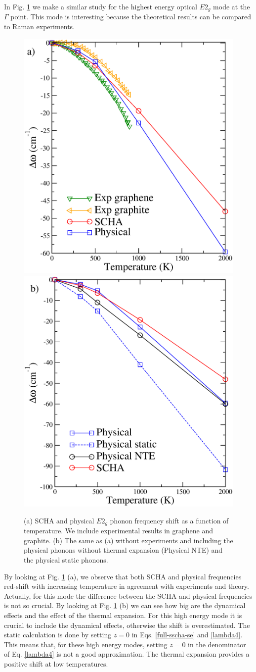 In Fig. \ref{e2g} we make a similar study for the highest energy optical $E2_{g}$ mode at the $\Gamma$ point. This 
mode is interesting because the theoretical results can be compared to Raman experiments\cite{linas2015interplay}. 
\begin{figure}[ht]
\includegraphics[width=0.49\linewidth]{Figures/e2g1.eps}
\includegraphics[width=0.49\linewidth]{Figures/e2g2.eps}
	\caption[E2g mode temperature dependent frequency shift]{(a) SCHA and physical $E2_{g}$ phonon frequency 
	shift as a function of temperature. We include experimental results in graphene\cite{linas2015interplay} and 
	graphite\cite{kagi1994proper,tan1999intrinsic}. (b) The same as (a) without experiments and including the 
	physical phonons without thermal expansion (Physical NTE) and the physical static phonons.}
\label{e2g}
\end{figure}
By looking at Fig. \ref{e2g} (a), we observe that both SCHA and physical frequencies red-shift with increasing 
temperature in agreement with experiments and theory\cite{calizo2007temperature,bonini2007phonon}. Actually, for 
this mode the difference between the SCHA and physical frequencies is not so crucial. By looking at Fig. \ref{e2g} 
(b) we can see how big are the dynamical effects and the effect of the thermal expansion. For this high energy mode 
it is crucial to include the dynamical effects, otherwise the shift is overestimated. The static calculation is done 
by setting $z=0$ in Eqs. \ref{full-sscha-se} and \ref{lambda4}. This means that, for these high energy modes, 
setting $z=0$ in the denominator of Eq. \ref{lambda4} is not a good approximation. The thermal expansion provides 
a positive shift at low temperatures. 

